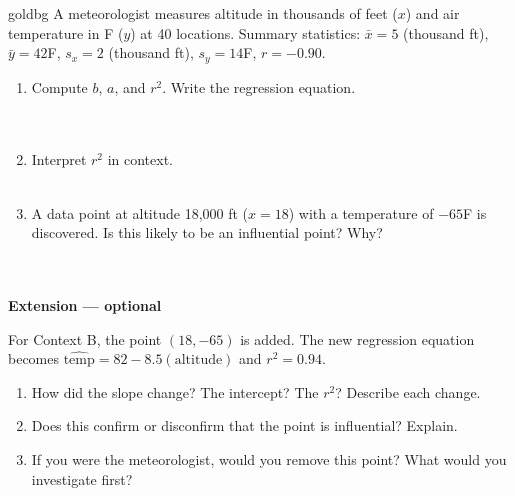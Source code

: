 \documentclass[10pt]{article}
\begin{document}
\vspace{0.18in}

\begin{scenariobox}{goldbg}
\small A meteorologist measures altitude in thousands of feet ($x$) and air temperature in
\textdegree F ($y$) at 40 locations. Summary statistics: $\bar{x} = 5$ (thousand ft),
$\bar{y} = 42$\textdegree F, $s_x = 2$ (thousand ft), $s_y = 14$\textdegree F, $r = -0.90$.
\end{scenariobox}

\vspace{0.1in}

\begin{enumerate}[leftmargin=1.6em, itemsep=0.18in, start=7]

  \item Compute $b$, $a$, and $r^2$. Write the regression equation.\\[8pt]
        \writeline\\[3pt]\writeline\\[3pt]\writeline

  \item Interpret $r^2$ in context.\\[8pt]
        \writeline\\[3pt]\writeline

  \item A data point at altitude 18,000 ft ($x = 18$) with a temperature of $-65$\textdegree F
        is discovered. Is this likely to be an influential point? Why?\\[8pt]
        \writeline\\[3pt]\writeline\\[3pt]\writeline

\end{enumerate}

\vspace{0.18in}

\begin{extensionbox}
\small\textbf{Extension --- optional}

\vspace{4pt}
For Context B, the point $(18, -65)$ is added. The new regression equation becomes
$\widehat{\text{temp}} = 82 - 8.5(\text{altitude})$ and $r^2 = 0.94$.

\begin{enumerate}[leftmargin=1.6em, itemsep=6pt]
  \item How did the slope change? The intercept? The $r^2$? Describe each change.
  \item Does this confirm or disconfirm that the point is influential? Explain.
  \item If you were the meteorologist, would you remove this point? What would you investigate first?
\end{enumerate}
\end{extensionbox}
\end{document}
